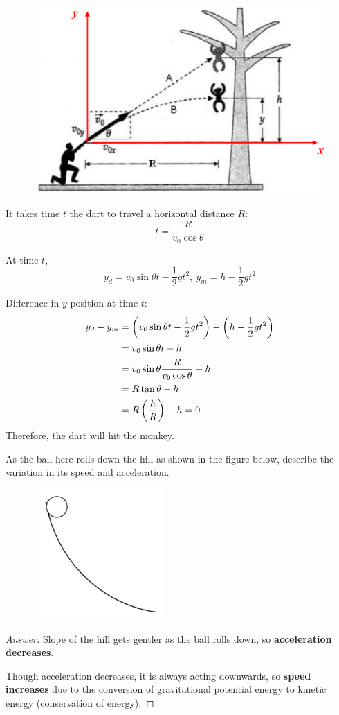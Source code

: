 \begin{figure}[H]
    \centering
    \includegraphics[width=12cm]{images/Monkey_hunter.png}
\end{figure}

\begin{solution}
It takes time $t$ the dart to travel a horizontal distance $R$:
\[ t=\frac{R}{v_0\cos\theta} \]

At time $t$,
\[ y_d=v_0\sin\theta t-\frac{1}{2}gt^2,\:y_m=h-\frac{1}{2}gt^2 \]

Difference in $y$-position at time $t$:
\begin{align*}
y_d-y_m 
&= \left(v_0\sin\theta t - \frac{1}{2}gt^2\right) - \left(h-\frac{1}{2}gt^2\right) \\
&= v_0\sin\theta t - h \\
&= v_0\sin\theta\frac{R}{v_0\cos\theta}-h \\
&= R\tan\theta - h \\
&= R\left(\frac{h}{R}\right)-h = 0
\end{align*}
Therefore, the dart will hit the monkey.
\end{solution}
\pagebreak

\begin{prbm}
As the ball here rolls down the hill as shown in the figure below, describe the variation in its speed and acceleration.
\begin{figure}[H]
    \centering
    \includegraphics[width=5cm]{images/ball_roll.png}
\end{figure}
\end{prbm}

\begin{proof}[Answer]
Slope of the hill gets gentler as the ball rolls down, so \textbf{acceleration decreases}. 

Though acceleration decreases, it is always acting downwards, so \textbf{speed increases} due to the conversion of gravitational potential energy to kinetic energy (conservation of energy).
\end{proof}

\pagebreak